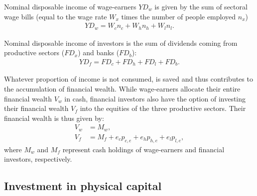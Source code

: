 \documentclass[authoryear]{article}
\begin{document}
Nominal disposable income of wage-earners $YD_w$ is given by the sum of sectoral wage bills (equal to the wage rate $W_x$ times the number of people employed $n_x$)
\begin{align}
YD_w=W_c n_c+ W_h n_h+W_l n_l.
\end{align}

Nominal disposable income of investors is the sum of dividends coming from productive sectors ($FD_x$) and banks ($FD_b$):
\begin{align}
YD_f=FD_c+FD_h+FD_l+FD_b.
\end{align}

Whatever proportion of income is not consumed, is saved and thus contributes to the accumulation of financial wealth. While wage-earners allocate their entire financial wealth $V_w$ in cash, financial investors also have the option of investing their financial wealth $V_f$ into the equities of the three productive sectors. Their financial wealth is thus given by: 
\begin{align}
V_w&=M_w, \\
V_f&=M_f+e_cp_{c,e}+e_hp_{h,e}+e_lp_{l,e},
\end{align}
where $M_w$ and $M_f$ represent cash holdings of wage-earners and financial investors, respectively.

\subsection{Investment in physical capital}
\label{sec:inv}
\end{document}
